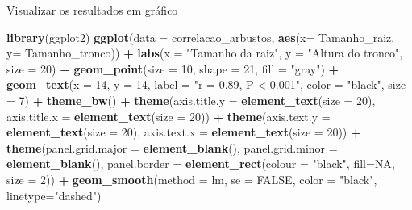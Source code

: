 \documentclass[
]{book}
\newenvironment{Shaded}{\begin{snugshade}}{\end{snugshade}}
\newcommand{\DataTypeTok}[1]{\textcolor[rgb]{0.13,0.29,0.53}{#1}}
\newcommand{\DecValTok}[1]{\textcolor[rgb]{0.00,0.00,0.81}{#1}}
\newcommand{\KeywordTok}[1]{\textcolor[rgb]{0.13,0.29,0.53}{\textbf{#1}}}
\newcommand{\NormalTok}[1]{#1}
\newcommand{\OperatorTok}[1]{\textcolor[rgb]{0.81,0.36,0.00}{\textbf{#1}}}
\newcommand{\OtherTok}[1]{\textcolor[rgb]{0.56,0.35,0.01}{#1}}
\newcommand{\StringTok}[1]{\textcolor[rgb]{0.31,0.60,0.02}{#1}}
\begin{document}
Visualizar os resultados em gráfico

\begin{Shaded}
\begin{Highlighting}[]
\KeywordTok{library}\NormalTok{(ggplot2)}
\KeywordTok{ggplot}\NormalTok{(}\DataTypeTok{data =}\NormalTok{ correlacao_arbustos, }\KeywordTok{aes}\NormalTok{(}\DataTypeTok{x=}\NormalTok{ Tamanho_raiz, }\DataTypeTok{y=}\NormalTok{ Tamanho_tronco)) }\OperatorTok{+}\StringTok{ }
\StringTok{  }\KeywordTok{labs}\NormalTok{(}\DataTypeTok{x =} \StringTok{"Tamanho da raiz"}\NormalTok{, }\DataTypeTok{y =} \StringTok{"Altura do tronco"}\NormalTok{, }\DataTypeTok{size =} \DecValTok{20}\NormalTok{) }\OperatorTok{+}
\StringTok{  }\KeywordTok{geom_point}\NormalTok{(}\DataTypeTok{size =} \DecValTok{10}\NormalTok{, }\DataTypeTok{shape =} \DecValTok{21}\NormalTok{, }\DataTypeTok{fill =} \StringTok{"gray"}\NormalTok{) }\OperatorTok{+}
\StringTok{  }\KeywordTok{geom_text}\NormalTok{(}\DataTypeTok{x =} \DecValTok{14}\NormalTok{, }\DataTypeTok{y =} \DecValTok{14}\NormalTok{, }\DataTypeTok{label =} \StringTok{"r = 0.89, P < 0.001"}\NormalTok{, }\DataTypeTok{color =} \StringTok{"black"}\NormalTok{, }\DataTypeTok{size =} \DecValTok{7}\NormalTok{) }\OperatorTok{+}
\StringTok{  }\KeywordTok{theme_bw}\NormalTok{() }\OperatorTok{+}
\StringTok{  }\KeywordTok{theme}\NormalTok{(}\DataTypeTok{axis.title.y =} \KeywordTok{element_text}\NormalTok{(}\DataTypeTok{size =} \DecValTok{20}\NormalTok{), }\DataTypeTok{axis.title.x =} \KeywordTok{element_text}\NormalTok{(}\DataTypeTok{size =} \DecValTok{20}\NormalTok{)) }\OperatorTok{+}
\StringTok{  }\KeywordTok{theme}\NormalTok{(}\DataTypeTok{axis.text.y =} \KeywordTok{element_text}\NormalTok{(}\DataTypeTok{size =} \DecValTok{20}\NormalTok{), }\DataTypeTok{axis.text.x =} \KeywordTok{element_text}\NormalTok{(}\DataTypeTok{size =} \DecValTok{20}\NormalTok{)) }\OperatorTok{+}
\StringTok{  }\KeywordTok{theme}\NormalTok{(}\DataTypeTok{panel.grid.major =} \KeywordTok{element_blank}\NormalTok{(), }\DataTypeTok{panel.grid.minor =} \KeywordTok{element_blank}\NormalTok{(), }
        \DataTypeTok{panel.border =} \KeywordTok{element_rect}\NormalTok{(}\DataTypeTok{colour =} \StringTok{"black"}\NormalTok{, }\DataTypeTok{fill=}\OtherTok{NA}\NormalTok{, }\DataTypeTok{size =} \DecValTok{2}\NormalTok{)) }\OperatorTok{+}
\StringTok{  }\KeywordTok{geom_smooth}\NormalTok{(}\DataTypeTok{method =}\NormalTok{ lm, }\DataTypeTok{se =} \OtherTok{FALSE}\NormalTok{, }\DataTypeTok{color =} \StringTok{"black"}\NormalTok{, }\DataTypeTok{linetype=}\StringTok{"dashed"}\NormalTok{) }
\end{Highlighting}
\end{Shaded}
\end{document}
